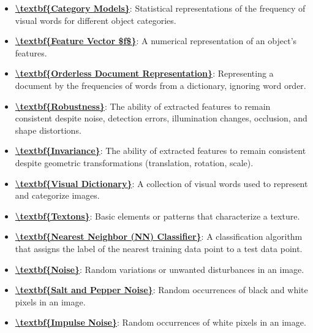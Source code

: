 \documentclass{article}%
\begin{document}
\begin{itemize}[leftmargin=*]
\item \href{https://www.math.purdue.edu/~yipn/351/07L2-Vision.pdf#page=18}{\textbf{\textbackslash{}textbf\{Category Models\}}}: Statistical representations of the frequency of visual words for different object categories.%
\item \href{https://www.math.purdue.edu/~yipn/351/07L2-Vision.pdf#page=19}{\textbf{\textbackslash{}textbf\{Feature Vector \$f\$\}}}: A numerical representation of an object's features.%
\item \href{https://www.math.purdue.edu/~yipn/351/07L2-Vision.pdf#page=20}{\textbf{\textbackslash{}textbf\{Orderless Document Representation\}}}: Representing a document by the frequencies of words from a dictionary, ignoring word order.%
\item \href{https://www.math.purdue.edu/~yipn/351/07L2-Vision.pdf#page=21}{\textbf{\textbackslash{}textbf\{Robustness\}}}: The ability of extracted features to remain consistent despite noise, detection errors, illumination changes, occlusion, and shape distortions.%
\item \href{https://www.math.purdue.edu/~yipn/351/07L2-Vision.pdf#page=21}{\textbf{\textbackslash{}textbf\{Invariance\}}}: The ability of extracted features to remain consistent despite geometric transformations (translation, rotation, scale).%
\item \href{https://www.math.purdue.edu/~yipn/351/07L2-Vision.pdf#page=23}{\textbf{\textbackslash{}textbf\{Visual Dictionary\}}}: A collection of visual words used to represent and categorize images.%
\item \href{https://www.math.purdue.edu/~yipn/351/07L2-Vision.pdf#page=28}{\textbf{\textbackslash{}textbf\{Textons\}}}: Basic elements or patterns that characterize a texture.%
\item \href{https://www.math.purdue.edu/~yipn/351/07L2-Vision.pdf#page=30}{\textbf{\textbackslash{}textbf\{Nearest Neighbor (NN) Classifier\}}}: A classification algorithm that assigns the label of the nearest training data point to a test data point.%
\item \href{https://www.math.purdue.edu/~yipn/351/07L2-Vision.pdf#page=33}{\textbf{\textbackslash{}textbf\{Noise\}}}: Random variations or unwanted disturbances in an image.%
\item \href{https://www.math.purdue.edu/~yipn/351/07L2-Vision.pdf#page=36}{\textbf{\textbackslash{}textbf\{Salt and Pepper Noise\}}}: Random occurrences of black and white pixels in an image.%
\item \href{https://www.math.purdue.edu/~yipn/351/07L2-Vision.pdf#page=36}{\textbf{\textbackslash{}textbf\{Impulse Noise\}}}: Random occurrences of white pixels in an image.%

\end{itemize}
\end{document}
